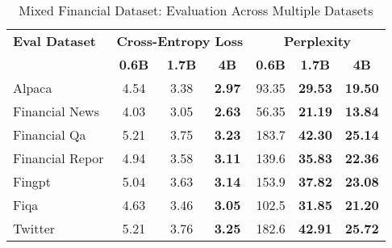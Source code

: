 
\begin{table}[h]
\centering
\caption{Mixed Financial Dataset: Evaluation Across Multiple Datasets}
\label{tab:mixed_financial_results}
\begin{tabular}{l|ccc|ccc}
\hline
\textbf{Eval Dataset} & \multicolumn{3}{c|}{\textbf{Cross-Entropy Loss}} & \multicolumn{3}{c}{\textbf{Perplexity}} \\
\cline{2-4} \cline{5-7}
  & \textbf{0.6B} & \textbf{1.7B} & \textbf{4B} & \textbf{0.6B} & \textbf{1.7B} & \textbf{4B} \\
\hline
Alpaca & 4.54 & 3.38 & \textbf{2.97} & 93.35 & \textbf{29.53} & \textbf{19.50} \\
Financial News & 4.03 & 3.05 & \textbf{2.63} & 56.35 & \textbf{21.19} & \textbf{13.84} \\
Financial Qa & 5.21 & 3.75 & \textbf{3.23} & 183.7 & \textbf{42.30} & \textbf{25.14} \\
Financial Repor & 4.94 & 3.58 & \textbf{3.11} & 139.6 & \textbf{35.83} & \textbf{22.36} \\
Fingpt & 5.04 & 3.63 & \textbf{3.14} & 153.9 & \textbf{37.82} & \textbf{23.08} \\
Fiqa & 4.63 & 3.46 & \textbf{3.05} & 102.5 & \textbf{31.85} & \textbf{21.20} \\
Twitter & 5.21 & 3.76 & \textbf{3.25} & 182.6 & \textbf{42.91} & \textbf{25.72} \\
\hline
\end{tabular}
\end{table}

